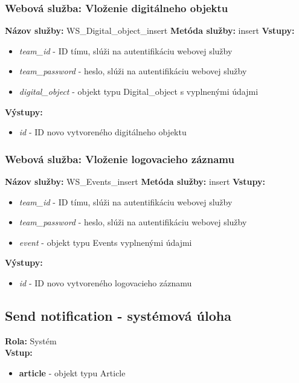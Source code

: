 \documentclass[10pt,oneside,slovak,a4paper]{article}
\begin{document}
\subsubsection{Webová služba: Vloženie digitálneho objektu}
\textbf{Názov služby:} WS\_Digital\_object\_insert
\textbf{Metóda služby:} insert
\textbf{Vstupy:}
	\begin{itemize}
		\item \textit{team\_id} - ID tímu, slúži na autentifikáciu webovej služby
		\item \textit{team\_password} - heslo, slúži na autentifikáciu webovej služby
		\item \textit{digital\_object} - objekt typu Digital\_object s vyplnenými údajmi
	\end{itemize}
\textbf{Výstupy:}
	\begin{itemize}
		\item \textit{id} - ID novo vytvoreného digitálneho objektu
	\end{itemize}
	
\subsubsection{Webová služba: Vloženie logovacieho záznamu}
\textbf{Názov služby:} WS\_Events\_insert
\textbf{Metóda služby:} insert
\textbf{Vstupy:}
	\begin{itemize}
		\item \textit{team\_id} - ID tímu, slúži na autentifikáciu webovej služby
		\item \textit{team\_password} - heslo, slúži na autentifikáciu webovej služby
		\item \textit{event} - objekt typu Events vyplnenými údajmi
	\end{itemize}
\textbf{Výstupy:}
	\begin{itemize}
		\item \textit{id} - ID novo vytvoreného logovacieho záznamu
	\end{itemize}

\subsection{Send notification - systémová úloha}
\textbf{Rola:} Systém\\
\textbf{Vstup:}

\begin{itemize}
\item \textbf{article} - objekt typu Article
\end{itemize}
\end{document}

